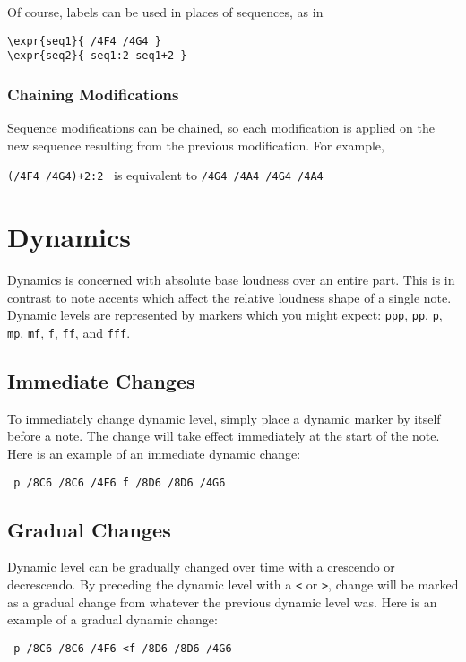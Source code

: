 \documentclass{scrartcl}
\begin{document}
Of course, labels can be used in places of sequences, as in
\begin{tabbing}
  \hspace{1in}\= \verb|\expr{seq1}{ /4F4 /4G4 }| \\
  \> \verb|\expr{seq2}{ seq1:2 seq1+2 }|
\end{tabbing}

\subsubsection{Chaining Modifications}
Sequence modifications can be chained, so each modification is applied on the new sequence resulting from the previous modification. For example,
\begin{center}
\verb|(/4F4 /4G4)+2:2| \ is equivalent to \verb|/4G4 /4A4 /4G4 /4A4|
\end{center}

\section{Dynamics}
Dynamics is concerned with absolute base loudness over an entire part. This is in contrast to note accents which affect the relative loudness shape of a single note. Dynamic levels are represented by markers which you might expect: \verb|ppp|, \verb|pp|, \verb|p|, \verb|mp|, \verb|mf|, \verb|f|, \verb|ff|, and \verb|fff|.

\subsection{Immediate Changes}
To immediately change dynamic level, simply place a dynamic marker by itself before a note. The change will take effect immediately at the start of the note. Here is an example of an immediate dynamic change: \begin{center}
\verb| p /8C6 /8C6 /4F6 f /8D6 /8D6 /4G6 |
\end{center}

\subsection{Gradual Changes}
Dynamic level can be gradually changed over time with a crescendo or decrescendo. By preceding the dynamic level with a \verb|<| or \verb|>|, change will be marked as a gradual change from whatever the previous dynamic level was. Here is an example of a gradual dynamic change:
\begin{center}
\verb| p /8C6 /8C6 /4F6 <f /8D6 /8D6 /4G6 |
\end{center}
\end{document}
